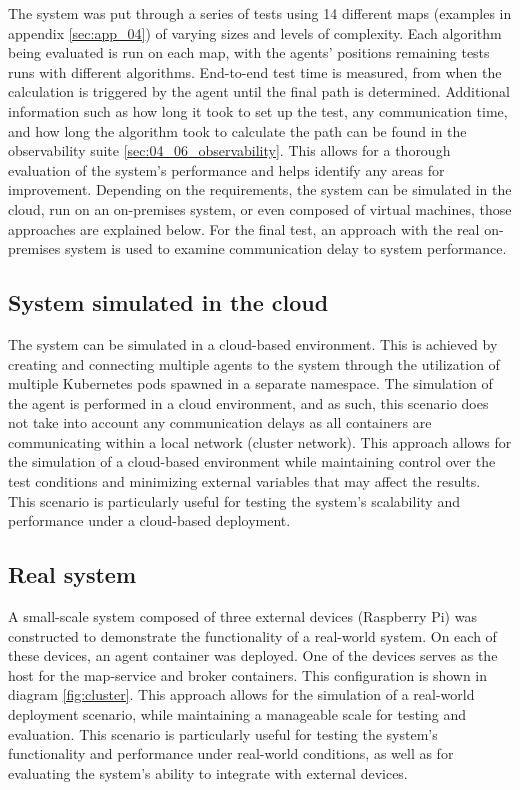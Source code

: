 The system was put through a series of tests using 14 different maps (examples in appendix \ref{sec:app_04}) of varying sizes and levels of complexity. Each algorithm being evaluated is run on each map, with the agents' positions remaining tests runs with different algorithms. End-to-end test time is measured, from when the calculation is triggered by the agent until the final path is determined. Additional information such as how long it took to set up the test, any communication time, and how long the algorithm took to calculate the path can be found in the observability suite \ref{sec:04_06_observability}. This allows for a thorough evaluation of the system's performance and helps identify any areas for improvement. Depending on the requirements, the system can be simulated in the cloud, run on an on-premises system, or even composed of virtual machines, those approaches are explained below. For the final test, an approach with the real on-premises system is used to examine communication delay to system performance.

\subsection{System simulated in the cloud}
The system can be simulated in a cloud-based environment. This is achieved by creating and connecting multiple agents to the system through the utilization of multiple Kubernetes pods spawned in a separate namespace. The simulation of the agent is performed in a cloud environment, and as such, this scenario does not take into account any communication delays as all containers are communicating within a local network (cluster network). This approach allows for the simulation of a cloud-based environment while maintaining control over the test conditions and minimizing external variables that may affect the results. This scenario is particularly useful for testing the system's scalability and performance under a cloud-based deployment.

\subsection{Real system}
A small-scale system composed of three external devices (Raspberry Pi) was constructed to demonstrate the functionality of a real-world system. On each of these devices, an agent container was deployed. One of the devices serves as the host for the map-service and broker containers. This configuration is shown in diagram \ref{fig:cluster}. This approach allows for the simulation of a real-world deployment scenario, while maintaining a manageable scale for testing and evaluation. This scenario is particularly useful for testing the system's functionality and performance under real-world conditions, as well as for evaluating the system's ability to integrate with external devices.

